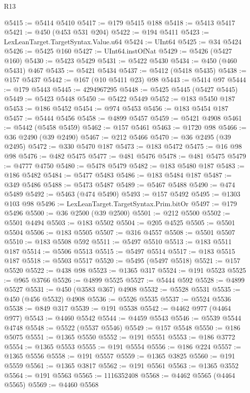 \begin{lexlean}{R13}
\begin{coremodule}
@5415 := @5414 @5410
@5417 := @179 @5415 @188
@5418 := @5413 @5417
@5421 := @450 (@453 @531 @204)
@5422 := @194 @5411
@5423 := LexLeanTarget.TargetSyntax.Value.u64
@5424 := UInt64
@5425 := @34 @5424
@5426 := @5425 @160
@5427 := UInt64.instOfNat
@5429 := @5426 (@5427 @160)
@5430 := @5423 @5429
@5431 := @5422 @5430
@5434 := @450 (@460 @5431) @467
@5435 := @5421 @5434
@5437 := @5412 (@5418 @5435)
@5438 := @157 @5437
@5442 := @167 (@10 @5411 @23) @98
@5443 := @5414 @97
@5444 := @179 @5443
@5445 := 4294967295
@5448 := @5425 @5445 (@5427 @5445)
@5449 := @5423 @5448
@5450 := @5422 @5449
@5452 := @183 @5450 @187
@5453 := @186 @5452
@5454 := @974 @5453
@5456 := @183 @5454 @187
@5457 := @5444 @5456
@5458 := @4899 @5457
@5459 := @5421 @4908
@5461 := @5442 (@5458 @5459)
@5462 := @157 @5461
@5463 := @1720 @98
@5466 := @36 @2490 (@39 @2490)
@5467 := @212 @5466
@5470 := @36 @2495 (@39 @2495)
@5472 := @330 @5470 @187
@5473 := @183 @5472
@5475 := @16 @98 @98
@5476 := @482 @5475
@5477 := @481 @5476
@5478 := @481 @5475
@5479 := @4777 @4750
@5480 := @5478 @5479
@5482 := @183 @5480 @187
@5483 := @186 @5482
@5484 := @5477 @5483
@5486 := @183 @5484 @187
@5487 := @349 @5486
@5488 := @5473 @5487
@5489 := @5467 @5488
@5490 := @474 @5489
@5492 := @5463 (@474 @5490)
@5493 := @157 @5492
@5495 := @1303 @103 @98
@5496 := LexLeanTarget.TargetSyntax.Prim.bitOr
@5497 := @179 @5496
@5500 := @36 @2500 (@39 @2500)
@5501 := @212 @5500
@5502 := @5501 @4494
@5503 := @183 @5502
@5504 := @205 @4525
@5505 := @5501 @5504
@5506 := @183 @5505
@5507 := @316 @4557
@5508 := @5501 @5507
@5510 := @183 @5508 @592
@5511 := @5497 @5510
@5513 := @183 @5511 @187
@5514 := @5506 @5513
@5515 := @5497 @5514
@5517 := @183 @5515 @187
@5518 := @5503 @5517
@5520 := @5495 (@5497 @5518)
@5521 := @157 @5520
@5522 := @438 @98
@5523 := @1365 @317
@5524 := @191 @5523
@5525 := @965 @3766
@5526 := @4899 @5525
@5527 := @5444 @592
@5528 := @4899 @5527
@5531 := @450 (@3583 @367) @4908
@5532 := @5528 @5531
@5535 := @450 (@456 @5532) @4908
@5536 := @5526 @5535
@5537 := @5524 @5536
@5538 := @849 @317
@5539 := @191 @5538
@5542 := @4462 @977 (@4464 @977)
@5543 := @4460 @5542
@5544 := @4459 @5543
@5546 := @5539 @5544 @4748
@5548 := @5522 (@5537 @5546)
@5549 := @157 @5548
@5550 := @186 @5075
@5551 := @1365 @5550
@5552 := @191 @5551
@5553 := @186 @3772
@5554 := @1365 @5553
@5555 := @191 @5554
@5556 := @186 @224
@5557 := @1365 @5556
@5558 := @191 @5557
@5559 := @1365 @3825
@5560 := @191 @5559
@5561 := @1365 @3817
@5562 := @191 @5561
@5563 := @1365 @3552
@5564 := @191 @5563
@5565 := 1116352408
@5568 := @4462 @5565 (@4464 @5565)
@5569 := @4460 @5568

\end{coremodule}
\end{lexlean}
